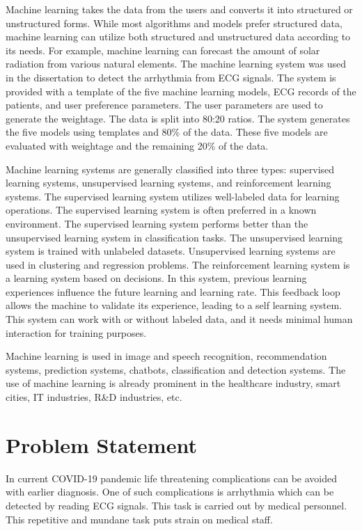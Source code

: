 Machine learning takes the data from the users and converts it into structured or unstructured forms. While most algorithms and models prefer structured data, machine learning can utilize both structured and unstructured data according to its needs. For example, machine learning can forecast the amount of solar radiation from various natural elements. The machine learning system was used in the dissertation to detect the arrhythmia from ECG signals. The system is provided with a template of the five machine learning models, ECG records of the patients, and user preference parameters. The user parameters are used to generate the weightage. The data is split into 80:20 ratios. The system generates the five models using templates and 80\% of the data. These five models are evaluated with weightage and the remaining 20\% of the data.

Machine learning systems are generally classified into three types: supervised learning systems, unsupervised learning systems, and reinforcement learning systems. The supervised learning system utilizes well-labeled data for learning operations. The supervised learning system is often preferred in a known environment. The supervised learning system performs better than the unsupervised learning system in classification tasks. The unsupervised learning system is trained with unlabeled datasets. Unsupervised learning systems are used in clustering and regression problems. The reinforcement learning system is a learning system based on decisions. In this system, previous learning experiences influence the future learning and learning rate. This feedback loop allows the machine to validate its experience, leading to a self learning system. This system can work with or without labeled data, and it needs minimal human interaction for training purposes.

Machine learning is used in image and speech recognition, recommendation systems, prediction systems, chatbots, classification and detection systems. The use of machine learning is already prominent in the healthcare industry, smart cities, IT industries, R\&D industries, etc.

\section{Problem Statement} \label{sec:problem_statement}
In current COVID-19 pandemic life threatening complications can be avoided with earlier diagnosis. One of such complications is arrhythmia which can be detected by reading ECG signals. This task is carried out by medical personnel. This repetitive and mundane task puts strain on medical staff.


